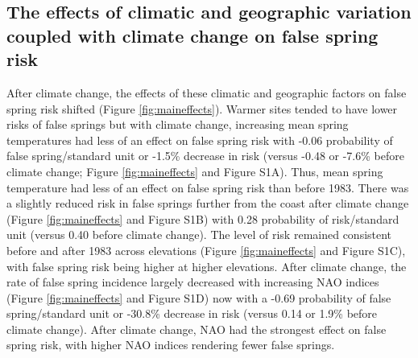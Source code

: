 \documentclass{article}\usepackage[]{graphicx}\usepackage[]{color}
\begin{document}
\subsection*{The effects of climatic and geographic variation coupled with climate change on false spring risk}
After climate change, the effects of these climatic and geographic factors on false spring risk shifted (Figure \ref{fig:maineffects}). Warmer sites tended to have lower risks of false springs but with climate change, increasing mean spring temperatures had less of an effect on false spring risk with -0.06 probability of false spring/standard unit or -1.5\% decrease in risk (versus -0.48 or -7.6\% before climate change; Figure \ref{fig:maineffects} and Figure S1A). Thus, mean spring temperature had less of an effect on false spring risk than before 1983. There was a slightly reduced risk in false springs further from the coast after climate change (Figure \ref{fig:maineffects} and Figure S1B) with 0.28 probability of risk/standard unit (versus 0.40 before climate change). The level of risk remained consistent before and after 1983 across elevations (Figure \ref{fig:maineffects} and Figure S1C), with false spring risk being higher at higher elevations. After climate change, the rate of false spring incidence largely decreased with increasing NAO indices (Figure \ref{fig:maineffects} and Figure S1D) now with a -0.69 probability of false spring/standard unit or -30.8\% decrease in risk (versus 0.14 or 1.9\% before climate change). After climate change, NAO had the strongest effect on false spring risk, with higher NAO indices rendering fewer false springs. 
\end{document}
